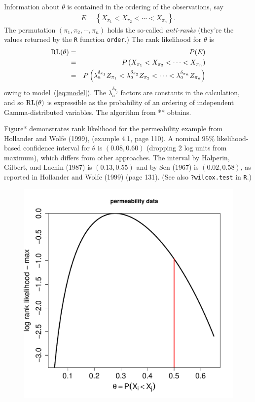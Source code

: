 Information about $\theta$ is contained in the ordering of the observations, 
say 
\begin{eqnarray*}
E = \left\{ X_{\pi_1} < X_{\pi_2} < \cdots < X_{\pi_n} \right\}.
\end{eqnarray*}
The permutation $(\pi_1, \pi_2, \cdots, \pi_n)$ holds 
 the so-called {\em anti-ranks}
(they're the values returned by the \verb+R+ function \verb+order+.)
The rank likelihood for $\theta$ is
\begin{eqnarray}
\label{eq:rl}
 {\rm RL}(\theta) & = & P(E) \\ \nonumber
   & = & P\left(   X_{\pi_1} < X_{\pi_2} < \cdots < X_{\pi_n} \right) \\ \nonumber
   &=& P\left(  \lambda_a^{\delta_{\pi_1}} Z_{\pi_1} <
                \lambda_a^{\delta_{\pi_2}} Z_{\pi_2} <
                 \cdots
                < \lambda_a^{\delta_{\pi_n}} Z_{\pi_n}  \right)  \nonumber
\end{eqnarray}
owing to model~(\ref{eq:model}).  The $\lambda_a^{ \delta_{\pi_j} }$ factors
are constants in the calculation, and so ${\rm RL}(\theta)$ is expressible
 as the probability of an ordering of independent Gamma-distributed variables.
The algorithm from ** obtains.

Figure* demonstrates rank likelihood for 
the permeability example from Hollander and Wolfe (1999),
(example 4.1, page 110).
A nominal $95\%$ likelihood-based confidence interval for $\theta$
is $(0.08, 0.60)$ (dropping 2 log units from maximum), which differs
from other approaches. The interval by Halperin, Gilbert, and Lachin (1987)
 is $(0.13, 0.55)$ and by Sen (1967) is $(0.02, 0.58)$, as reported
in Hollander and Wolfe (1999) (page 131). (See also 
\verb+?wilcox.test+ in \verb+R+.) 

\begin{figure}
\centering
\includegraphics[height=.5\textheight]{R/figs/pd1.pdf}
\end{figure}

